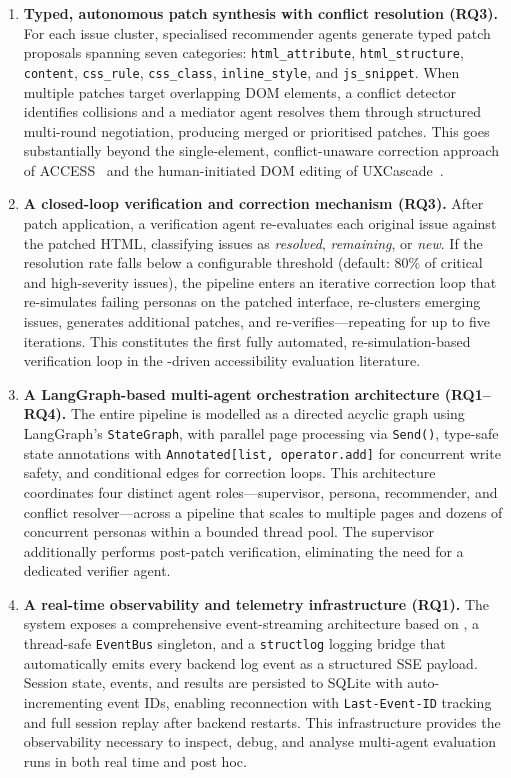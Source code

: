 \begin{enumerate}
  \item \textbf{Typed, autonomous patch synthesis with conflict resolution (RQ3).} For each issue cluster, specialised recommender agents generate typed patch proposals spanning seven categories: \texttt{html\_attribute}, \texttt{html\_structure}, \texttt{content}, \texttt{css\_rule}, \texttt{css\_class}, \texttt{inline\_style}, and \texttt{js\_snippet}. When multiple patches target overlapping DOM elements, a conflict detector identifies collisions and a mediator agent resolves them through structured multi-round  negotiation, producing merged or prioritised patches. This goes substantially beyond the single-element, conflict-unaware correction approach of ACCESS~\cite{access} and the human-initiated DOM editing of UXCascade~\cite{uxcascade}.

  \item \textbf{A closed-loop verification and correction mechanism (RQ3).} After patch application, a verification agent re-evaluates each original issue against the patched HTML, classifying issues as \textit{resolved}, \textit{remaining}, or \textit{new}. If the resolution rate falls below a configurable threshold (default: 80\% of critical and high-severity issues), the pipeline enters an iterative correction loop that re-simulates failing personas on the patched interface, re-clusters emerging issues, generates additional patches, and re-verifies---repeating for up to five iterations. This constitutes the first fully automated, re-simulation-based verification loop in the -driven accessibility evaluation literature.

  \item \textbf{A LangGraph-based multi-agent orchestration architecture (RQ1--RQ4).} The entire pipeline is modelled as a directed acyclic graph using LangGraph's \texttt{StateGraph}, with parallel page processing via \texttt{Send()}, type-safe state annotations with \texttt{Annotated[list, operator.add]} for concurrent write safety, and conditional edges for correction loops. This architecture coordinates four distinct agent roles---supervisor, persona, recommender, and conflict resolver---across a pipeline that scales to multiple pages and dozens of concurrent personas within a bounded thread pool. The supervisor additionally performs post-patch verification, eliminating the need for a dedicated verifier agent.

  \item \textbf{A real-time observability and telemetry infrastructure (RQ1).} The system exposes a comprehensive event-streaming architecture based on , a thread-safe \texttt{EventBus} singleton, and a \texttt{structlog} logging bridge that automatically emits every backend log event as a structured SSE payload. Session state, events, and results are persisted to SQLite with auto-incrementing event IDs, enabling reconnection with \texttt{Last-Event-ID} tracking and full session replay after backend restarts. This infrastructure provides the observability necessary to inspect, debug, and analyse multi-agent evaluation runs in both real time and post hoc.
\end{enumerate}


